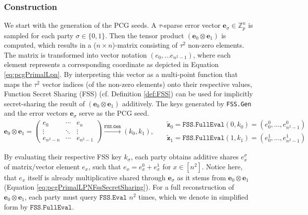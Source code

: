 \subsubsection{Construction}
We start with the generation of the PCG seeds. A $\tau$-sparse error vector $\mathbf{e}_\sigma \in \mathbb{Z}_p^n$ is sampled for each party $\sigma\in\{0,1\}$. Then the tensor product $(\mathbf{e}_0 \otimes \mathbf{e}_1)$ is computed, which results in a ($n\times n$)-matrix consisting of $\tau^2$ non-zero elements. The matrix is transformed into vector notation $(e_0, ... e_{n^2-1})$, where each element represents a corresponding coordinate as depicted in Equation \ref{eq:pcgPrimalLpn}. By interpreting this vector as a multi-point function that maps the $\tau^2$ vector indices (of the non-zero elements) onto their respective values, Function Secret Sharing (FSS) (cf. Definition \ref{def:FSS}) can be used for implicitly secret-sharing the result of $(\mathbf{e}_0 \otimes \mathbf{e}_1)$ additively. The keys generated by \texttt{FSS.Gen} and the error vectors $\mathbf{e}_\sigma$ serve as the PCG seed.
\begin{equation}
\label{eq:pcgPrimalLpn}
\mathbf{e}_0 \otimes \mathbf{e}_1 = 
\begin{pmatrix}
e_{0} & \cdots & e_{n} \\
\vdots & \ddots & \vdots \\
e_{n^2-n} & \cdots & e_{n^2-1}
\end{pmatrix}
\overset{\texttt{FSS.Gen}}{\longrightarrow}
(k_0, k_1), \:\:\:
\begin{aligned}
& \mathbf{\tilde{z}}_0 = \texttt{FSS.FullEval}(0, k_0) = (e_{0}^0, \ldots, e_{n^2-1}^0) \\
& \mathbf{\tilde{z}}_1 = \texttt{FSS.FullEval}(1, k_1) = (e_{0}^1, \ldots, e_{n^2-1}^1)
\end{aligned}
\end{equation}

By evaluating their respective FSS key $k_\sigma$, each party obtains additive shares $e_x^\sigma$ of matrix/vector element $e_x$, such that $e_x = e_x^0 + e_x^1$ for $ x\in [n^{2}]$. Notice here, that $e_x$ itself is already multiplicative shared through $\mathbf{e}_\sigma$ as it stems from $\mathbf{e}_0 \otimes \mathbf{e}_1$ (Equation \ref{eq:pcgPrimalLPNFssSecretSharing}). For a full reconstruction of $\mathbf{e}_0 \otimes \mathbf{e}_1$, each party must query $\texttt{FSS.Eval}$ $n^2$ times, which we denote in simplified form by $\texttt{FSS.FullEval}$.

